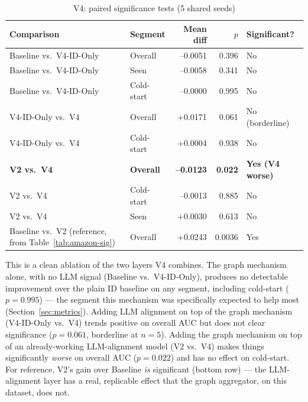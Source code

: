 \begin{table}[h]
\centering
\caption{V4: paired significance tests (5 shared seeds)}
\label{tab:v4-sig}
\begin{tabular}{llrrl}
\toprule
Comparison & Segment & Mean diff & $p$ & Significant? \\
\midrule
Baseline vs.\ V4-ID-Only & Overall & --0.0051 & 0.396 & No \\
Baseline vs.\ V4-ID-Only & Seen & --0.0058 & 0.341 & No \\
Baseline vs.\ V4-ID-Only & Cold-start & --0.0000 & 0.995 & No \\
V4-ID-Only vs.\ V4 & Overall & +0.0171 & 0.061 & No (borderline) \\
V4-ID-Only vs.\ V4 & Cold-start & +0.0004 & 0.938 & No \\
\textbf{V2 vs.\ V4} & \textbf{Overall} & \textbf{--0.0123} & \textbf{0.022} & \textbf{Yes (V4 worse)} \\
V2 vs.\ V4 & Cold-start & --0.0013 & 0.885 & No \\
V2 vs.\ V4 & Seen & +0.0030 & 0.613 & No \\
Baseline vs.\ V2 (reference, from Table~\ref{tab:amazon-sig}) & Overall & +0.0243 & 0.0036 & Yes \\
\bottomrule
\end{tabular}
\end{table}

This is a clean ablation of the two layers V4 combines. The graph mechanism alone, with no LLM signal (Baseline vs.\ V4-ID-Only), produces no detectable improvement over the plain ID baseline on any segment, including cold-start ($p=0.995$) --- the segment this mechanism was specifically expected to help most (Section~\ref{sec:metrics}). Adding LLM alignment on top of the graph mechanism (V4-ID-Only vs.\ V4) trends positive on overall AUC but does not clear significance ($p=0.061$, borderline at $n=5$). Adding the graph mechanism on top of an already-working LLM-alignment model (V2 vs.\ V4) makes things significantly \emph{worse} on overall AUC ($p=0.022$) and has no effect on cold-start. For reference, V2's gain over Baseline \emph{is} significant (bottom row) --- the LLM-alignment layer has a real, replicable effect that the graph aggregator, on this dataset, does not.

